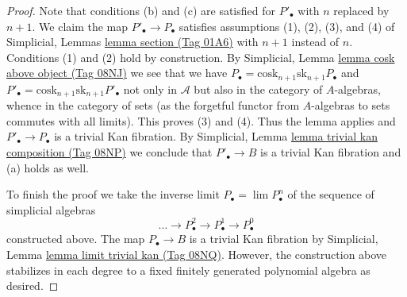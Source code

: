 \documentclass{amsart}
\theoremstyle{plain}
\theoremstyle{definition}
\theoremstyle{remark}
\numberwithin{equation}{subsection}
\def\lim{\mathop{\mathrm{lim}}\nolimits}
\begin{document}
\begin{proof}
\medskip\noindent
Note that conditions (b) and (c) are satisfied for $P'_\bullet$ with $n$
replaced by $n + 1$. We claim the map $P'_\bullet \to P_\bullet$ satisfies
assumptions (1), (2), (3), and (4) of
Simplicial, Lemmas \href{https://stacks.math.columbia.edu/tag/01A6}{lemma section (Tag 01A6)}
with $n + 1$ instead of $n$. Conditions (1) and (2) hold by construction.
By Simplicial, Lemma \href{https://stacks.math.columbia.edu/tag/08NJ}{lemma cosk above object (Tag 08NJ)}
we see that we have
$P_\bullet = \text{cosk}_{n + 1}\text{sk}_{n + 1}P_\bullet$
and
$P'_\bullet = \text{cosk}_{n + 1}\text{sk}_{n + 1}P'_\bullet$
not only in $\mathcal{A}$ but also in the category of $A$-algebras,
whence in the category of sets (as the forgetful functor from $A$-algebras
to sets commutes with all limits). This proves (3) and (4). Thus the lemma
applies and $P'_\bullet \to P_\bullet$ is a trivial Kan fibration. By
Simplicial, Lemma \href{https://stacks.math.columbia.edu/tag/08NP}{lemma trivial kan composition (Tag 08NP)}
we conclude that $P'_\bullet \to B$ is a trivial Kan fibration and (a)
holds as well.

\medskip\noindent
To finish the proof we take the inverse limit $P_\bullet = \lim P^n_\bullet$
of the sequence of simplicial algebras
$$
\ldots \to P^2_\bullet \to P^1_\bullet \to P^0_\bullet
$$
constructed above. The map $P_\bullet \to B$ is a trivial Kan fibration by
Simplicial, Lemma \href{https://stacks.math.columbia.edu/tag/08NQ}{lemma limit trivial kan (Tag 08NQ)}.
However, the construction above stabilizes in each degree
to a fixed finitely generated polynomial algebra as desired.
\end{proof}
\end{document}
